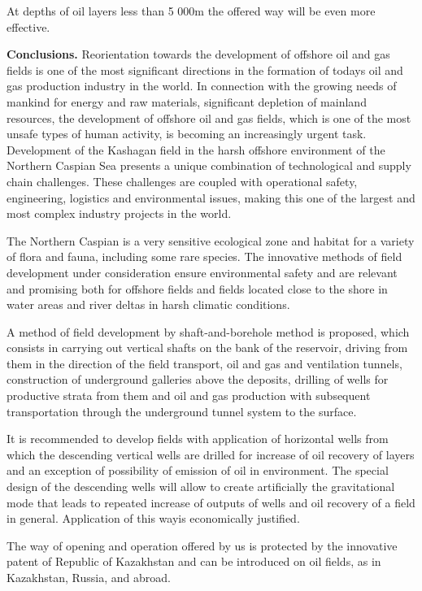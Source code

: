 \begin{multicols}{2}
At depths of oil layers less than 5 000m the offered way will be even
more effective.

{\bfseries Conclusions.} Reorientation towards the development of offshore
oil and gas fields is one of the most significant directions in the
formation of today\textquotesingle s oil and gas production industry in
the world. In connection with the growing needs of mankind for energy
and raw materials, significant depletion of mainland resources, the
development of offshore oil and gas fields, which is one of the most
unsafe types of human activity, is becoming an increasingly urgent task.
Development of the Kashagan field in the harsh offshore environment of
the Northern Caspian Sea presents a unique combination of technological
and supply chain challenges. These challenges are coupled with
operational safety, engineering, logistics and environmental issues,
making this one of the largest and most complex industry projects in the
world.

The Northern Caspian is a very sensitive ecological zone and habitat for
a variety of flora and fauna, including some rare species. The
innovative methods of field development under consideration ensure
environmental safety and are relevant and promising both for offshore
fields and fields located close to the shore in water areas and river
deltas in harsh climatic conditions.

A method of field development by shaft-and-borehole method is proposed,
which consists in carrying out vertical shafts on the bank of the
reservoir, driving from them in the direction of the field transport,
oil and gas and ventilation tunnels, construction of underground
galleries above the deposits, drilling of wells for productive strata
from them and oil and gas production with subsequent transportation
through the underground tunnel system to the surface.

It is recommended to develop fields with application of horizontal wells
from which the descending vertical wells are drilled for increase of oil
recovery of layers and an exception of possibility of emission of oil in
environment. The special design of the descending wells will allow to
create artificially the gravitational mode that leads to repeated
increase of outputs of wells and oil recovery of a field in general.
Application of this wayis economically justified.

The way of opening and operation offered by us is protected by the
innovative patent of Republic of Kazakhstan and can be introduced on oil
fields, as in Kazakhstan, Russia, and abroad.
\end{multicols}

